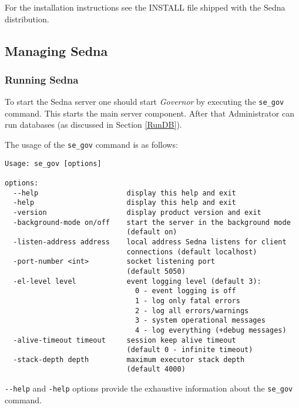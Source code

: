 \documentclass[a4paper,12pt]{article}
\begin{document}
For the installation instructions see the INSTALL file shipped with the
Sedna distribution.


\subsection{Managing Sedna}
\subsubsection{Running Sedna}
\label{StartSedna}

To start the Sedna server one should start \emph{Governor} by executing the
\verb!se_gov! command. This starts the main server component. After that
Administrator can run databases (as discussed in Section \ref{RunDB}).

The usage of the \verb!se_gov! command is as follows:

\small{
\begin{verbatim}
Usage: se_gov [options]

options:
  --help                     display this help and exit
  -help                      display this help and exit
  -version                   display product version and exit
  -background-mode on/off    start the server in the background mode
                             (default on)
  -listen-address address    local address Sedna listens for client
                             connections (default localhost)
  -port-number <int>         socket listening port
                             (default 5050)
  -el-level level            event logging level (default 3):
                               0 - event logging is off
                               1 - log only fatal errors
                               2 - log all errors/warnings
                               3 - system operational messages
                               4 - log everything (+debug messages)
  -alive-timeout timeout     session keep alive timeout
                             (default 0 - infinite timeout)
  -stack-depth depth         maximum executor stack depth
                             (default 4000)
\end{verbatim}}

\verb!--help! and \verb!-help! options provide the exhaustive information about
the \verb!se_gov! command.
\end{document}
